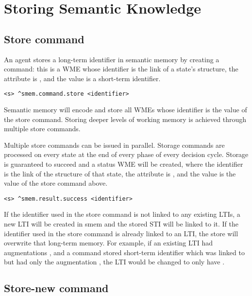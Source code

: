 \section{Storing Semantic Knowledge}
\label{SMEM-store}

\subsection{Store command}

An agent stores a long-term identifier in semantic memory by creating a  command: this is a WME whose identifier is the  link of a state's  structure, the attribute is , and the value is a short-term identifier.

\begin{verbatim}
<s> ^smem.command.store <identifier>
\end{verbatim}

Semantic memory will encode and store all WMEs whose identifier is the value of the store command.  
Storing deeper levels of working memory is achieved through multiple store commands.

Multiple store commands can be issued in parallel.  
Storage commands are processed on every state at the end of every phase of every decision cycle.  
Storage is guaranteed to succeed and a status WME will be created, where the identifier is the  link of the  structure of that state, the attribute is , and the value is the value of the store command above.

\begin{verbatim}
<s> ^smem.result.success <identifier>
\end{verbatim}

If the identifier used in the store command is not linked to any existing LTIs, a new LTI will be created in smem and the stored STI will be linked to it. If the identifier used in the store command is already linked to an LTI, the store will overwrite that long-term memory.
For example, if an existing LTI  had augmentations , and a  command stored short-term identifier  which was linked to  but had only the augmentation , the LTI  would be changed to only have .

\subsection{Store-new command}

